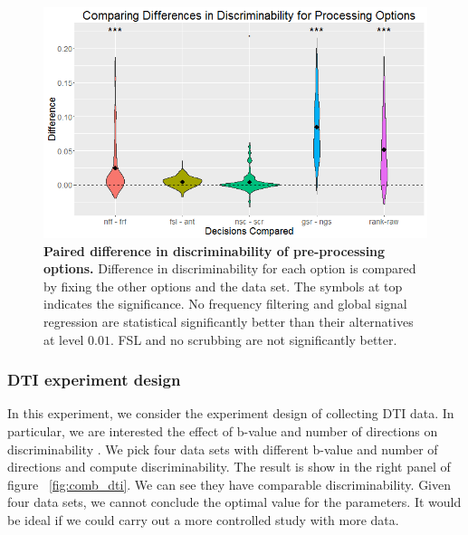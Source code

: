 \documentclass{article}
\begin{document}
\begin{figure}[H]
	\includegraphics[width=\linewidth]{../Figs/mri_decs_violin.png}
	\caption{{ \bf Paired difference in discriminability of pre-processing options.} Difference in discriminability for each option is compared by fixing the other options and the data set. The symbols at top indicates the significance. No frequency filtering and global signal regression are statistical significantly better than their alternatives at level $0.01$. FSL and no scrubbing are not significantly better. }
	\label{fig:decs}
\end{figure}



\subsubsection{DTI experiment design}
In this experiment, we consider the experiment design of collecting DTI data. In particular, we are interested the effect of b-value and number of directions on discriminability \cite{westin2002processing}. We pick four data sets with different b-value and number of directions and compute discriminability. The result is show in the right panel of figure ~\ref{fig:comb_dti}. We can see they have comparable discriminability. Given four data sets, we cannot conclude the optimal value for the parameters. It would be ideal if we could carry out a more controlled study with more data.
\end{document}
